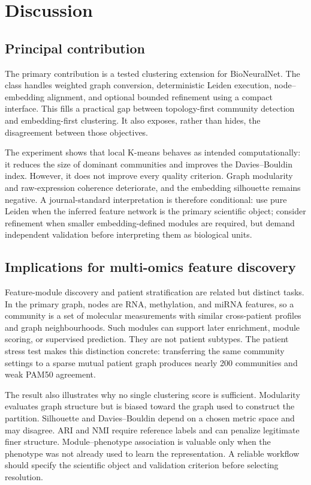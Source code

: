 \documentclass[11pt]{article}
\begin{document}
\section{Discussion}

\subsection{Principal contribution}

The primary contribution is a tested clustering extension for BioNeuralNet. The class handles weighted graph conversion, deterministic Leiden execution, node--embedding alignment, and optional bounded refinement using a compact interface. This fills a practical gap between topology-first community detection and embedding-first clustering. It also exposes, rather than hides, the disagreement between those objectives.

The experiment shows that local K-means behaves as intended computationally: it reduces the size of dominant communities and improves the Davies--Bouldin index. However, it does not improve every quality criterion. Graph modularity and raw-expression coherence deteriorate, and the embedding silhouette remains negative. A journal-standard interpretation is therefore conditional: use pure Leiden when the inferred feature network is the primary scientific object; consider refinement when smaller embedding-defined modules are required, but demand independent validation before interpreting them as biological units.

\subsection{Implications for multi-omics feature discovery}

Feature-module discovery and patient stratification are related but distinct tasks. In the primary graph, nodes are RNA, methylation, and miRNA features, so a community is a set of molecular measurements with similar cross-patient profiles and graph neighbourhoods. Such modules can support later enrichment, module scoring, or supervised prediction. They are not patient subtypes. The patient stress test makes this distinction concrete: transferring the same community settings to a sparse mutual patient graph produces nearly 200 communities and weak PAM50 agreement.

The result also illustrates why no single clustering score is sufficient. Modularity evaluates graph structure but is biased toward the graph used to construct the partition. Silhouette and Davies--Bouldin depend on a chosen metric space and may disagree. ARI and NMI require reference labels and can penalize legitimate finer structure. Module--phenotype association is valuable only when the phenotype was not already used to learn the representation. A reliable workflow should specify the scientific object and validation criterion before selecting resolution.
\end{document}
